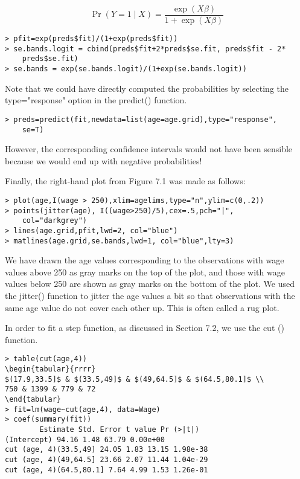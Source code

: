 \documentclass[10pt]{article}
\begin{document}
$$
\operatorname{Pr}(Y=1 \mid X)=\frac{\exp (X \beta)}{1+\exp (X \beta)}
$$

\begin{verbatim}
> pfit=exp(preds$fit)/(1+exp(preds$fit))
> se.bands.logit = cbind(preds$fit+2*preds$se.fit, preds$fit - 2*
    preds$se.fit)
> se.bands = exp(se.bands.logit)/(1+exp(se.bands.logit))
\end{verbatim}

Note that we could have directly computed the probabilities by selecting the type="response" option in the predict() function.

\begin{verbatim}
> preds=predict(fit,newdata=list(age=age.grid),type="response",
    se=T)
\end{verbatim}

However, the corresponding confidence intervals would not have been sensible because we would end up with negative probabilities!

Finally, the right-hand plot from Figure 7.1 was made as follows:

\begin{verbatim}
> plot(age,I(wage > 250),xlim=agelims,type="n",ylim=c(0,.2))
> points(jitter(age), I((wage>250)/5),cex=.5,pch="|",
    col="darkgrey")
> lines(age.grid,pfit,lwd=2, col="blue")
> matlines(age.grid,se.bands,lwd=1, col="blue",lty=3)
\end{verbatim}

We have drawn the age values corresponding to the observations with wage values above 250 as gray marks on the top of the plot, and those with wage values below 250 are shown as gray marks on the bottom of the plot. We used the jitter() function to jitter the age values a bit so that observations with the same age value do not cover each other up. This is often called a rug plot.

In order to fit a step function, as discussed in Section 7.2, we use the cut () function.

\begin{verbatim}
> table(cut(age,4))
\begin{tabular}{rrrr}
$(17.9,33.5]$ & $(33.5,49]$ & $(49,64.5]$ & $(64.5,80.1]$ \\
750 & 1399 & 779 & 72
\end{tabular}
> fit=lm(wage~cut(age,4), data=Wage)
> coef(summary(fit))
        Estimate Std. Error t value Pr (>|t|)
(Intercept) 94.16 1.48 63.79 0.00e+00
cut (age, 4)(33.5,49] 24.05 1.83 13.15 1.98e-38
cut (age, 4)(49,64.5] 23.66 2.07 11.44 1.04e-29
cut (age, 4)(64.5,80.1] 7.64 4.99 1.53 1.26e-01
\end{verbatim}
\end{document}
